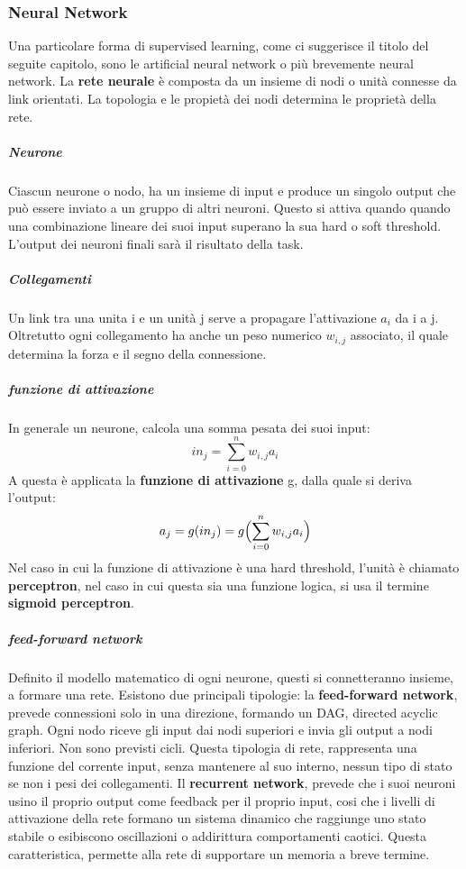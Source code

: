 \documentclass[14pt]{extarticle}
\begin{document}
\begin{itemize}
\subsubsection{Neural Network}
Una particolare forma di supervised learning, come ci suggerisce il titolo del seguite capitolo, sono le artificial neural network o più brevemente neural network. 
La \textbf{rete neurale} è composta da un insieme di nodi o unità connesse da link orientati.\cite{russell2005intelligenza}
 La topologia e le propietà dei nodi determina le proprietà della rete.
\subparagraph{Neurone}
Ciascun neurone o nodo, ha un insieme di input e produce un singolo output che può essere inviato a un gruppo di altri neuroni. Questo si attiva quando quando una combinazione lineare dei suoi input superano la sua hard o soft threshold. L'output dei neuroni finali sarà il risultato della task.
\subparagraph{Collegamenti}
Un link tra una unita i e un unità j serve a propagare l'attivazione $a_{i}$ da i a j. Oltretutto ogni collegamento ha anche un peso numerico $w_{i,j}$ associato, il quale determina la forza e il segno della connessione.
\subparagraph{funzione di attivazione}
In generale un neurone, calcola una somma pesata dei suoi input:
\[in_j=\sum_{i=0}^n  w_{i,j}a_{i}\]
A questa è applicata la \textbf{funzione di attivazione} g, dalla quale si deriva l'output:
\[a_j=g(in_j)=g \Bigl (\sum_{i=0}^n  w_{i,j}a_{i} \Bigr )\]
Nel caso in cui la funzione di attivazione è una hard threshold, l'unità è chiamato \textbf{perceptron}, nel caso in cui questa sia una funzione logica, si usa il termine \textbf{sigmoid perceptron}.
\subparagraph{feed-forward network}
Definito il modello matematico di ogni neurone, questi si connetteranno insieme, a formare una rete.
Esistono due principali tipologie: 
la \textbf{feed-forward network}, prevede connessioni solo in una direzione, formando un DAG, directed acyclic graph. Ogni nodo riceve gli input dai nodi superiori e invia gli output a nodi inferiori. Non sono previsti cicli. Questa tipologia di rete, rappresenta una funzione del corrente input, senza mantenere al suo interno, nessun tipo di stato se non i pesi dei collegamenti.
Il \textbf{recurrent network}, prevede che i suoi neuroni usino il proprio output come feedback per il proprio input, cosi che i livelli di attivazione della rete formano un sistema dinamico che raggiunge uno stato stabile o
esibiscono oscillazioni o addirittura comportamenti caotici. Questa caratteristica, permette alla rete di supportare un memoria a breve termine.

\end{itemize}
\end{document}

